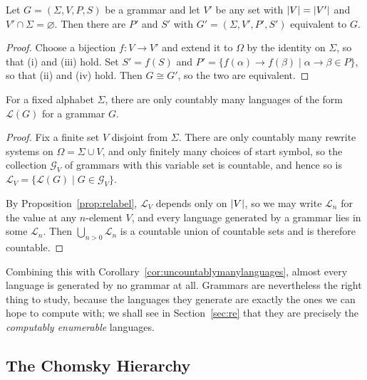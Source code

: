 \documentclass[a4paper]{scrartcl}
\newcommand{\lang}{\mathcal{L}}
\begin{document}
\begin{proposition}\label{prop:relabel}
	Let $G = (\Sigma, V, P, S)$ be a grammar and let $V'$ be any set with $\lvert V\rvert = \lvert V'\rvert$ and $V' \cap \Sigma = \varnothing$. Then there are $P'$ and $S'$ with $G' = (\Sigma, V', P', S')$ equivalent to $G$.
\end{proposition}

\begin{proof}
	Choose a bijection $f \colon V \to V'$ and extend it to $\Omega$ by the identity on $\Sigma$, so that (i) and (iii) hold. Set $S' = f(S)$ and $P' = \{f(\alpha) \to f(\beta) \mid \alpha \to \beta \in P\}$, so that (ii) and (iv) hold. Then $G \cong G'$, so the two are equivalent.
\end{proof}

\begin{proposition}\label{prop:countablymanygrammarlanguages}
	For a fixed alphabet $\Sigma$, there are only countably many languages of the form $\lang(G)$ for a grammar $G$.
\end{proposition}

\begin{proof}
	Fix a finite set $V$ disjoint from $\Sigma$. There are only countably many rewrite systems on $\Omega = \Sigma \cup V$, and only finitely many choices of start symbol, so the collection $\mathcal{G}_V$ of grammars with this variable set is countable, and hence so is $\mathcal{L}_V = \{\lang(G) \mid G \in \mathcal{G}_V\}$.

	By Proposition~\ref{prop:relabel}, $\mathcal{L}_V$ depends only on $\lvert V\rvert$, so we may write $\mathcal{L}_n$ for the value at any $n$-element $V$, and every language generated by a grammar lies in some $\mathcal{L}_n$. Then $\bigcup_{n > 0} \mathcal{L}_n$ is a countable union of countable sets and is therefore countable.
\end{proof}

Combining this with Corollary~\ref{cor:uncountablymanylanguages}, almost every language is generated by no grammar at all. Grammars are nevertheless the right thing to study, because the languages they generate are exactly the ones we can hope to compute with; we shall see in Section~\ref{sec:re} that they are precisely the \emph{computably enumerable} languages.

\subsection{The Chomsky Hierarchy}
\end{document}
